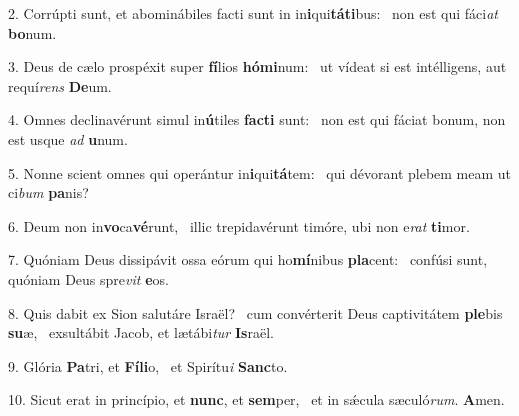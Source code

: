 2. Corrúpti sunt, et abominábiles facti sunt in in\textbf{i}qui\textbf{tá}\textbf{ti}bus: \ast\  non est qui fáci\textit{at} \textbf{bo}num.\

3. Deus de cælo prospéxit super \textbf{fí}lios \textbf{hó}\textbf{mi}num: \ast\  ut vídeat si est intélligens, aut requí\textit{rens} \textbf{De}um.\

4. Omnes declinavérunt simul in\textbf{ú}tiles \textbf{fac}\textbf{ti} sunt: \ast\  non est qui fáciat bonum, non est usque \textit{ad} \textbf{u}num.\

5. Nonne scient omnes qui operántur in\textbf{i}qui\textbf{tá}tem: \ast\  qui dévorant plebem meam ut ci\textit{bum} \textbf{pa}nis?\

6. Deum non in\textbf{vo}ca\textbf{vé}runt, \ast\  illic trepidavérunt timóre, ubi non e\textit{rat} \textbf{ti}mor.\

7. Quóniam Deus dissipávit ossa eórum qui ho\textbf{mí}nibus \textbf{pla}cent: \ast\  confúsi sunt, quóniam Deus spre\textit{vit} \textbf{e}os.\

8. Quis dabit ex Sion salutáre Israël? \dag\  cum convérterit Deus captivitátem \textbf{ple}bis \textbf{su}æ, \ast\  exsultábit Jacob, et lætábi\textit{tur} \textbf{Is}raël.\

9. Glória \textbf{Pa}tri, et \textbf{Fí}\textbf{li}o, \ast\  et Spirítu\textit{i} \textbf{Sanc}to.\

10. Sicut erat in princípio, et \textbf{nunc}, et \textbf{sem}per, \ast\  et in sǽcula sæculó\textit{rum}. \textbf{A}men.\

